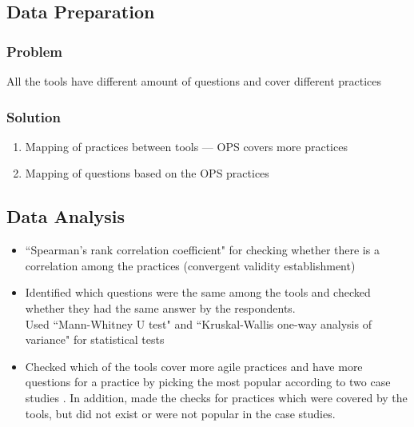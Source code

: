 
\clearpage


\subsection{Data Preparation}

\subsubsection{Problem}
All the tools have different amount of questions and cover different practices

\subsubsection{Solution}
\begin{enumerate}
	\item Mapping of practices between tools --- OPS covers more practices
	\item Mapping of questions based on the OPS practices
\end{enumerate}

\clearpage


\subsection{Data Analysis}

\begin{itemize}
	\item ``Spearman's rank correlation coefficient" for checking whether there is a correlation among the practices (convergent validity establishment)
	\item Identified which questions were the same among the tools and checked whether they had the same answer by the respondents. \\ Used ``Mann-Whitney U test" and ``Kruskal-Wallis one-way analysis of variance" for statistical tests
	\item Checked which of the tools cover more agile practices and have more questions for a practice by picking the most popular according to two case studies \cite{Williams_Microsoft, laurie_williams}. In addition, made the checks for practices which were covered by the tools, but did not exist or were not popular in the case studies.
\end{itemize}



